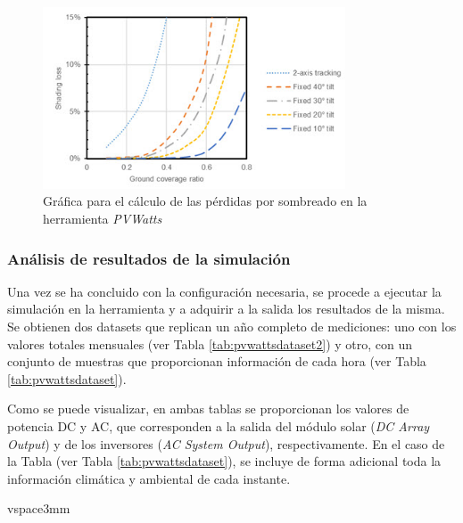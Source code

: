 \begin{figure}[H]
    \centering
    \includegraphics[width=0.8\textwidth]{img/diseno/sombra.png}
    \caption{Gráfica para el cálculo de las pérdidas por sombreado en la herramienta \textit{PVWatts}~\cite{pvwatts}}
    \label{fig:sombra}
\end{figure}

\subsubsection{Análisis de resultados de la simulación}
\label{sec:resultadossimu}

Una vez se ha concluido con la configuración necesaria, se procede a ejecutar la simulación en la herramienta y a adquirir a la salida los resultados de la misma. Se obtienen dos datasets que replican un año completo de mediciones: uno con los valores totales mensuales (ver Tabla \ref{tab:pvwattsdataset2}) y otro, con un conjunto de muestras que proporcionan información de cada hora (ver Tabla \ref{tab:pvwattsdataset}). 

\vspace{3mm}

Como se puede visualizar, en ambas tablas se proporcionan los valores de potencia DC y AC, que corresponden a la salida del módulo solar (\textit{DC Array Output}) y de los inversores (\textit{AC System Output}), respectivamente. En el caso de la Tabla (ver Tabla \ref{tab:pvwattsdataset}), se incluye de forma adicional toda la información climática y ambiental de cada instante.

vspace{3mm}

